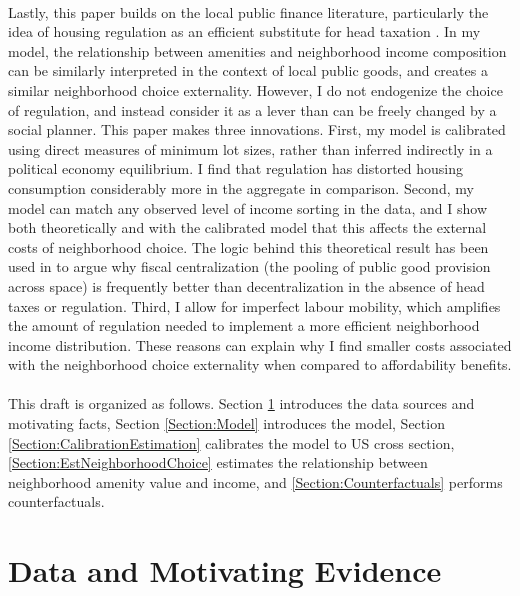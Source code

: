 \documentclass[12pt]{article}
\begin{document}
	\paragraph*{}
	Lastly, this paper builds on the local public finance literature, particularly the idea of housing regulation as an efficient substitute for head taxation \citep{hamilton1976, calabresetal, FernRogerson1996,  keepingpeopleout, eppleplatt, ineffTiebout, barcoate}. In my model, the relationship between amenities and neighborhood income composition can be similarly interpreted in the context of local public goods, and creates a similar neighborhood choice externality. However, I do not endogenize the choice of regulation, and instead consider it as a lever than can be freely changed by a social planner. This paper makes three innovations. First, my model is calibrated using direct measures of minimum lot sizes, rather than inferred indirectly in a political economy equilibrium. I find that regulation has distorted housing consumption considerably more in the aggregate in comparison. Second, my model can match any observed level of income sorting in the data, and I show both theoretically and with the calibrated model that this affects the external costs of neighborhood choice. The logic behind this theoretical result has been used in \cite{ineffTiebout} to argue why fiscal centralization (the pooling of public good provision across space) is frequently better than decentralization in the absence of head taxes or regulation. Third, I allow for imperfect labour mobility, which amplifies the amount of regulation needed to implement a more efficient neighborhood income distribution. These reasons can explain why I find smaller costs associated with the neighborhood choice externality when compared to affordability benefits.
	
	\paragraph*{}
	This draft is organized as follows. Section \ref{Section:Evidence} introduces the data sources and motivating facts, Section \ref{Section:Model} introduces the model, Section \ref{Section:CalibrationEstimation} calibrates the model to US cross section, \ref{Section:EstNeighborhoodChoice} estimates the relationship between neighborhood amenity value and income, and \ref{Section:Counterfactuals} performs counterfactuals. 


	\section{Data and Motivating Evidence}\label{Section:Evidence}
\end{document}
